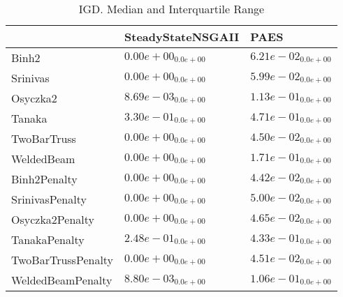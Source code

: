 \documentclass{article}
\begin{document}
\begin{table}
\caption{IGD. Median and Interquartile Range}
\label{table: IGD}
\centering
\begin{scriptsize}
\begin{tabular}{lll}
\hline & SteadyStateNSGAII &  PAES\\
\hline 
Binh2 & \cellcolor{gray95}$  0.00e+00_{ 0.0e+00}$ & \cellcolor{gray25}$  6.21e-02_{ 0.0e+00}$ \\
Srinivas & \cellcolor{gray95}$  0.00e+00_{ 0.0e+00}$ & \cellcolor{gray25}$  5.99e-02_{ 0.0e+00}$ \\
Osyczka2 & \cellcolor{gray95}$  8.69e-03_{ 0.0e+00}$ & \cellcolor{gray25}$  1.13e-01_{ 0.0e+00}$ \\
Tanaka & \cellcolor{gray95}$  3.30e-01_{ 0.0e+00}$ & \cellcolor{gray25}$  4.71e-01_{ 0.0e+00}$ \\
TwoBarTruss & \cellcolor{gray95}$  0.00e+00_{ 0.0e+00}$ & \cellcolor{gray25}$  4.50e-02_{ 0.0e+00}$ \\
WeldedBeam & \cellcolor{gray95}$  0.00e+00_{ 0.0e+00}$ & \cellcolor{gray25}$  1.71e-01_{ 0.0e+00}$ \\
Binh2Penalty & \cellcolor{gray95}$  0.00e+00_{ 0.0e+00}$ & \cellcolor{gray25}$  4.42e-02_{ 0.0e+00}$ \\
SrinivasPenalty & \cellcolor{gray95}$  0.00e+00_{ 0.0e+00}$ & \cellcolor{gray25}$  5.00e-02_{ 0.0e+00}$ \\
Osyczka2Penalty & \cellcolor{gray95}$  0.00e+00_{ 0.0e+00}$ & \cellcolor{gray25}$  4.65e-02_{ 0.0e+00}$ \\
TanakaPenalty & \cellcolor{gray95}$  2.48e-01_{ 0.0e+00}$ & \cellcolor{gray25}$  4.33e-01_{ 0.0e+00}$ \\
TwoBarTrussPenalty & \cellcolor{gray95}$  0.00e+00_{ 0.0e+00}$ & \cellcolor{gray25}$  4.51e-02_{ 0.0e+00}$ \\
WeldedBeamPenalty & \cellcolor{gray95}$  8.80e-03_{ 0.0e+00}$ & \cellcolor{gray25}$  1.06e-01_{ 0.0e+00}$ \\
\hline
\end{tabular}
\end{scriptsize}
\end{table}
\end{document}
